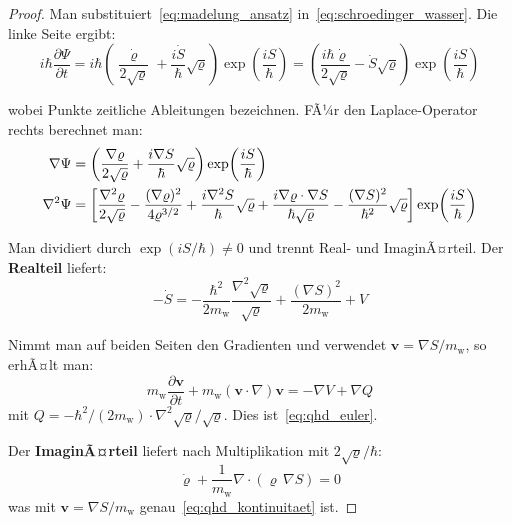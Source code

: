 ﻿\documentclass[12pt,a4paper]{report}
\begin{document}
\begin{proof}
	Man substituiert~\eqref{eq:madelung_ansatz} in~\eqref{eq:schroedinger_wasser}. Die linke Seite ergibt:
	\begin{equation}
		i\hbar\frac{\partial\Psi}{\partial t} = i\hbar\left(\frac{\dot{\varrho}}{2\sqrt{\varrho}} + \frac{i\dot{S}}{\hbar}\sqrt{\varrho}\right)\exp\!\left(\frac{iS}{\hbar}\right)
		= \left(\frac{i\hbar\dot{\varrho}}{2\sqrt{\varrho}} - \dot{S}\sqrt{\varrho}\right)\exp\!\left(\frac{iS}{\hbar}\right)
		\label{eq:beweis_links}
	\end{equation}
	
	wobei Punkte zeitliche Ableitungen bezeichnen. FÃ¼r den Laplace-Operator rechts berechnet man:
	\begin{align}
		\nabla\Psi &= \left(\frac{\nabla\varrho}{2\sqrt{\varrho}} + \frac{i\nabla S}{\hbar}\sqrt{\varrho}\right)\exp\!\left(\frac{iS}{\hbar}\right) \notag\\
		\nabla^2\Psi &= \left[\frac{\nabla^2\varrho}{2\sqrt{\varrho}} - \frac{(\nabla\varrho)^2}{4\varrho^{3/2}} + \frac{i\nabla^2 S}{\hbar}\sqrt{\varrho} + \frac{i\nabla\varrho\cdot\nabla S}{\hbar\sqrt{\varrho}} - \frac{(\nabla S)^2}{\hbar^2}\sqrt{\varrho}\right]\exp\!\left(\frac{iS}{\hbar}\right) \label{eq:beweis_laplace}
	\end{align}
	
	Man dividiert durch $\exp(iS/\hbar)\neq 0$ und trennt Real- und ImaginÃ¤rteil. Der \textbf{Realteil} liefert:
	\begin{equation}
		-\dot{S} = -\frac{\hbar^2}{2m_\mathrm{w}}\frac{\nabla^2\sqrt{\varrho}}{\sqrt{\varrho}} + \frac{(\nabla S)^2}{2m_\mathrm{w}} + V
		\label{eq:beweis_real}
	\end{equation}
	
	Nimmt man auf beiden Seiten den Gradienten und verwendet $\mathbf{v} = \nabla S/m_\mathrm{w}$, so erhÃ¤lt man:
	\begin{equation}
		m_\mathrm{w}\frac{\partial\mathbf{v}}{\partial t} + m_\mathrm{w}(\mathbf{v}\cdot\nabla)\mathbf{v} = -\nabla V + \nabla Q
	\end{equation}
	mit $Q = -\hbar^2/(2m_\mathrm{w})\cdot \nabla^2\sqrt{\varrho}/\sqrt{\varrho}$. Dies ist~\eqref{eq:qhd_euler}.
	
	Der \textbf{ImaginÃ¤rteil} liefert nach Multiplikation mit $2\sqrt{\varrho}/\hbar$:
	\begin{equation}
		\dot{\varrho} + \frac{1}{m_\mathrm{w}}\nabla\cdot(\varrho\,\nabla S) = 0
	\end{equation}
	was mit $\mathbf{v} = \nabla S/m_\mathrm{w}$ genau~\eqref{eq:qhd_kontinuitaet} ist.
\end{proof}
\end{document}
